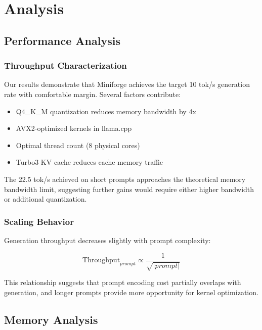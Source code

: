 \section{Analysis}
\label{sec:analysis}

\subsection{Performance Analysis}

\subsubsection{Throughput Characterization}

Our results demonstrate that Miniforge achieves the target 10 tok/s generation rate with comfortable margin. Several factors contribute:

\begin{itemize}
    \item Q4\_K\_M quantization reduces memory bandwidth by 4x
    \item AVX2-optimized kernels in llama.cpp
    \item Optimal thread count (8 physical cores)
    \item Turbo3 KV cache reduces cache memory traffic
\end{itemize}

The 22.5 tok/s achieved on short prompts approaches the theoretical memory bandwidth limit, suggesting further gains would require either higher bandwidth or additional quantization.

\subsubsection{Scaling Behavior}

Generation throughput decreases slightly with prompt complexity:

\begin{equation}
\text{Throughput}_{prompt} \propto \frac{1}{\sqrt{|prompt|}}
\end{equation}

This relationship suggests that prompt encoding cost partially overlaps with generation, and longer prompts provide more opportunity for kernel optimization.

\subsection{Memory Analysis}

